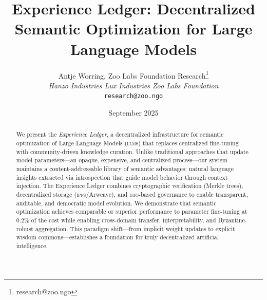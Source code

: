 \documentclass[11pt,letterpaper]{article}
\title{\textbf{Experience Ledger: Decentralized Semantic Optimization for Large Language Models}}
\author{
Antje Worring, Zoo Labs Foundation Research\thanks{research@zoo.ngo}\\
\textit{Hanzo Industries \quad Lux Industries \quad Zoo Labs Foundation}\\
\texttt{research@zoo.ngo}
}
\date{September 2025}
\newcommand{\DAO}{\textsc{dao}}
\newcommand{\IPFS}{\textsc{ipfs}}
\newcommand{\LLM}{\textsc{llm}}
\begin{document}
\zoocoverpage

\begin{abstract}
We present the \textit{Experience Ledger}, a decentralized infrastructure for semantic optimization of Large Language Models (\LLM{}s) that replaces centralized fine-tuning with community-driven knowledge curation. Unlike traditional approaches that update model parameters—an opaque, expensive, and centralized process—our system maintains a content-addressable library of semantic advantages: natural language insights extracted via introspection that guide model behavior through context injection. The Experience Ledger combines cryptographic verification (Merkle trees), decentralized storage (\IPFS{}/Arweave), and \DAO{}-based governance to enable transparent, auditable, and democratic model evolution. We demonstrate that semantic optimization achieves comparable or superior performance to parameter fine-tuning at 0.2\% of the cost while enabling cross-domain transfer, interpretability, and Byzantine-robust aggregation. This paradigm shift—from implicit weight updates to explicit wisdom commons—establishes a foundation for truly decentralized artificial intelligence.
\end{abstract}


















\end{document}
